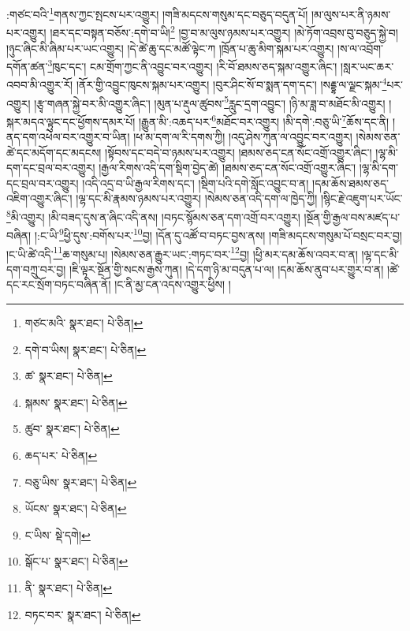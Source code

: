 :གཙང་བའི་\footnote{གཙང་མའི་  སྣར་ཐང་།  པེ་ཅིན། }གནས་ཀྱང་སྤངས་པར་འགྱུར། །གཟི་མདངས་གསུམ་དང་བཅུད་བདུན་པོ། །མ་ལུས་པར་ནི་ཉམས་པར་འགྱུར། །ཐར་དང་བསྟན་བཅོས་:དགེ་བ་ཡི།\footnote{དགེ་བ་ཡིས།  སྣར་ཐང་།  པེ་ཅིན། } །བྱ་བ་མ་ལུས་ཉམས་པར་འགྱུར། །མེ་ཏོག་འབྲས་བུ་བཅུད་སྐྱེ་བ། །ཉུང་ཞིང་མི་ཞིམ་པར་ཡང་འགྱུར། །དེ་ཚེ་ཆུ་དང་མཚོ་ལྟེང་ཀ །ཁྲོན་པ་ཆུ་མིག་སྐམ་པར་འགྱུར། །ས་ལ་འབྲོག་དགོན་ཚན་\footnote{ཚ་  སྣར་ཐང་།  པེ་ཅིན། }ཁུང་དང་། ངམ་གྲོག་ཀྱང་ནི་འབྱུང་བར་འགྱུར། །རི་བོ་ཐམས་ཅད་སྐམ་འགྱུར་ཞིང་། །སླར་ཡང་ཆར་འབབ་མི་འགྱུར་རོ། །ནོར་གྱི་འབྱུང་ཁུངས་སྐམ་པར་འགྱུར། །བུར་ཤིང་སོ་བ་སྨན་དག་དང་། །སརྡྷ་ལ་ལྗང་སྐམ་\footnote{སྐམས་  སྣར་ཐང་།  པེ་ཅིན། }པར་འགྱུར། །རྩྭ་གཞན་སྐྱེ་བར་མི་འགྱུར་ཞིང་། །མུན་པ་རྡུལ་ཚུབས་\footnote{ཚུབ་  སྣར་ཐང་།  པེ་ཅིན། }རླུང་དྲག་འབྱུང་། །ཉི་མ་ཟླ་བ་མཐོང་མི་འགྱུར། །སྐར་མདའ་ལྟུང་དང་ཕྱོགས་དམར་པོ། །རྒྱུན་མི་:འཆད་པར་\footnote{ཆད་པར་  པེ་ཅིན། }མཐོང་བར་འགྱུར། །མི་དགེ་:བཅུ་ཡི་\footnote{བཅུ་ཡིས་  སྣར་ཐང་།  པེ་ཅིན། }ཆོས་དང་ནི། །ནད་དག་འཕེལ་བར་འགྱུར་བ་ཡིན། །ཕ་མ་དག་ལ་རི་དགས་ཀྱི། །འདུ་ཤེས་ཀུན་ལ་འབྱུང་བར་འགྱུར། །སེམས་ཅན་ཚེ་དང་མདོག་དང་མདངས། །སྟོབས་དང་བདེ་བ་ཉམས་པར་འགྱུར། །ཐམས་ཅད་ངན་སོང་འགྲོ་འགྱུར་ཞིང་། །ལྷ་མི་དག་དང་བྲལ་བར་འགྱུར། །རྒྱལ་རིགས་འདི་དག་སྡིག་བྱེད་ཚེ། །ཐམས་ཅད་ངན་སོང་འགྲོ་འགྱུར་ཞིང་། །ལྷ་མི་དག་དང་བྲལ་བར་འགྱུར། །འདི་འདྲ་བ་ཡི་རྒྱལ་རིགས་དང་། །སྡིག་པའི་དགེ་སློང་འབྱུང་བ་ན། །དམ་ཆོས་ཐམས་ཅད་འཇིག་འགྱུར་ཞིང་། །ལྷ་དང་མི་རྣམས་ཉམས་པར་འགྱུར། །སེམས་ཅན་འདི་དག་ལ་ཁྱེད་ཀྱི། །སྙིང་རྗེ་འཇུག་པར་ཡོང་\footnote{ཡོངས་  སྣར་ཐང་།  པེ་ཅིན། }མི་འགྱུར། །མི་བཟད་དུས་ན་ཞིང་འདི་ནས། །བཏང་སྙོམས་ཅན་དག་འགྲོ་བར་འགྱུར། །སྔོན་གྱི་རྒྱལ་བས་མཛད་པ་བཞིན། །:ང་ཡི་\footnote{ང་ཡིས་  སྡེ་དགེ། }ཕྱི་དུས་:བགོས་པར་\footnote{སྒོང་པ་  སྣར་ཐང་།  པེ་ཅིན། }བྱ། །དོན་དུ་འཚོ་བ་བཏང་བྱས་ནས། །གཟི་མདངས་གསུམ་པོ་བསྲང་བར་བྱ། །ང་ཡི་ཚེ་འདི་\footnote{ནི་  སྣར་ཐང་།  པེ་ཅིན། }ཆ་གསུམ་པ། །སེམས་ཅན་རྒྱུར་ཡང་:གཏང་བར་\footnote{བཏང་བར་  སྣར་ཐང་།  པེ་ཅིན། }བྱ། །ཕྱི་མར་དམ་ཆོས་འབར་བ་ན། །ལྷ་དང་མི་དག་བཀྲུ་བར་བྱ། །ཇི་ལྟར་སྔོན་གྱི་སངས་རྒྱས་ཀུན། །དེ་དག་ཉི་མ་བདུན་པ་ལ། །དམ་ཆོས་ནུབ་པར་གྱུར་བ་ན། །ཚེ་དང་རང་སྲོག་བཏང་བཞིན་ནོ། །ང་ནི་མྱ་ངན་འདས་འགྱུར་ཕྱིས། །
